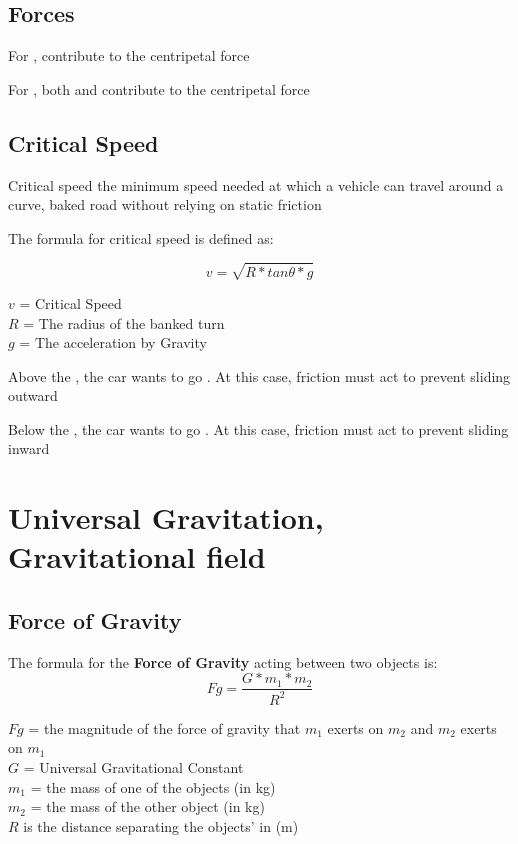 \subsection{Forces}
For ,  contribute to the centripetal force

For , both  and  contribute to the centripetal force

\subsection{Critical Speed}
\begin{definition}
    Critical speed the minimum speed needed at which a vehicle can travel around a curve, baked road without relying on static friction
\end{definition}

The formula for critical speed is defined as:
\begin{cyanblock}
    \[
        v = \sqrt{R*tan\theta *g}
    \]
    \begin{center}
        $v$ = Critical Speed\\
        $R$ = The radius of the banked turn\\
        $g$ = The acceleration by Gravity\\
    \end{center}
\end{cyanblock}

Above the , the car wants to go . At this case, friction must act  to prevent sliding outward

Below the , the car wants to go . At this case, friction must act  to prevent sliding inward

\newpage
\section{Universal Gravitation, Gravitational field}
\subsection{Force of Gravity}
The formula for the \textbf{Force of Gravity} acting between two objects is:
\[
    Fg = \frac{G * m_{1} * m_{2}}{R^2}
\]
\begin{center}
    $Fg$ = the magnitude of the force of gravity that $m_{1}$ exerts on $m_{2}$ and $m_{2}$ exerts on $m_{1}$\\
    $G$ = Universal Gravitational Constant\\
    $m_{1}$ = the mass of one of the objects (in kg)\\
    $m_{2}$ = the mass of the other object (in kg)\\
    $R$ is the distance separating the objects'  in (m)
\end{center}

